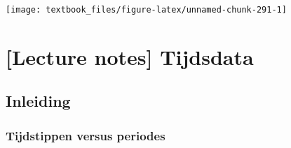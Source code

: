 \documentclass[]{tufte-book}
\begin{document}
\texttt{[image: textbook\_files/figure-latex/unnamed-chunk-291-1]}

\hypertarget{lecture-notes-tijdsdata}{%
\chapter{{[}Lecture notes{]} Tijdsdata}\label{lecture-notes-tijdsdata}}

\hypertarget{inleiding-2}{%
\section{Inleiding}\label{inleiding-2}}

\hypertarget{tijdstippen-versus-periodes}{%
\subsection{Tijdstippen versus periodes}\label{tijdstippen-versus-periodes}}
\end{document}
